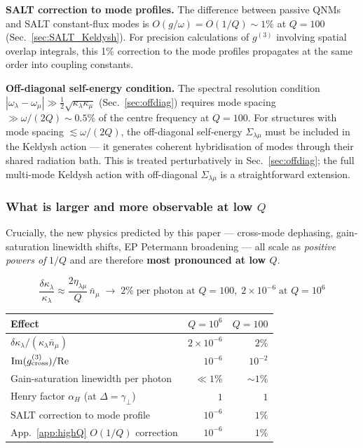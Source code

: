 \documentclass[12pt]{article}
\begin{document}
\textbf{SALT correction to mode profiles.}  The difference between
passive QNMs and SALT constant-flux modes is $O(g/\omega)=O(1/Q)\sim 1\%$
at $Q=100$ (Sec.~\ref{sec:SALT_Keldysh}).  For precision calculations
of $g^{(3)}$ involving spatial overlap integrals, this 1\% correction
to the mode profiles propagates at the same order into coupling constants.

\textbf{Off-diagonal self-energy condition.}  The spectral resolution
condition $|\omega_\lambda-\omega_\mu|\gg\frac{1}{2}\sqrt{\kappa_\lambda\kappa_\mu}$
(Sec.~\ref{sec:offdiag}) requires mode spacing $\gg \omega/(2Q)\sim 0.5\%$
of the centre frequency at $Q=100$.  For structures with mode spacing
$\lesssim\omega/(2Q)$, the off-diagonal self-energy $\Sigma_{\lambda\mu}$
must be included in the Keldysh action --- it generates coherent
hybridisation of modes through their shared radiation bath.  This is
treated perturbatively in Sec.~\ref{sec:offdiag}; the full multi-mode
Keldysh action with off-diagonal $\Sigma_{\lambda\mu}$ is a
straightforward extension.

\subsubsection*{What is larger and more observable at low $Q$}

Crucially, the new physics predicted by this paper --- cross-mode
dephasing, gain-saturation linewidth shifts, EP Petermann broadening
--- all scale as \emph{positive powers of} $1/Q$ and are therefore
\textbf{most pronounced at low $Q$}.

\begin{equation}
  \frac{\delta\kappa_\lambda}{\kappa_\lambda} \approx
  \frac{2\eta_{\lambda\mu}}{Q}\,\bar{n}_\mu
  \;\to\; 2\%\;\text{per photon at }Q=100,\;
  2\times10^{-6}\;\text{at }Q=10^6
  \label{eq:lowQ_scaling}
\end{equation}

\begin{center}
\begin{tabular}{lrr}
\toprule
Effect & $Q=10^6$ & $Q=100$ \\
\midrule
$\delta\kappa_\lambda/(\kappa_\lambda\bar{n}_\mu)$ &
  $2\times10^{-6}$ & $2\%$ \\
$\mathrm{Im}(g^{(3)}_{\rm cross})/\mathrm{Re}$ &
  $10^{-6}$ & $10^{-2}$ \\
Gain-saturation linewidth per photon &
  $\ll 1\%$ & $\sim 1\%$ \\
Henry factor $\alpha_H$ (at $\Delta=\gamma_\perp$) &
  $1$ & $1$ \\
SALT correction to mode profile &
  $10^{-6}$ & $1\%$ \\
App.~\ref{app:highQ} $O(1/Q)$ correction &
  $10^{-6}$ & $1\%$ \\
\bottomrule
\end{tabular}
\end{center}
\end{document}
